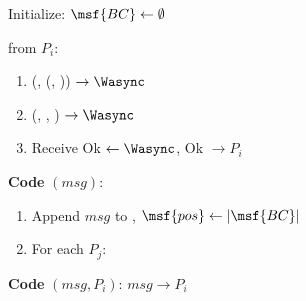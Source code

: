 \begin{bbox}[title={$\mathcal{F}_\msf{Atomic-Final}$}]

Initialize: $\msf{BC} \leftarrow \emptyset$

\OnInput {} from $P_i$:
	\begin{enumerate}
		\item \Send (\Leak, (, \Partyi)) $\rightarrow \Wasync$

		\item \Send (\Schedule, , ) $\rightarrow \Wasync$

		\item Receive Ok $\leftarrow \Wasync$, \Send Ok $\rightarrow P_i$

	\end{enumerate}
   
{\color{Blue} {\bf Code}  $(msg)$:}

	\begin{enumerate}
		\item {\color{Blue} Append $msg$ to , $\msf{pos} \leftarrow |\msf{BC}|$}

		\item {\color{Blue} For each $P_j$:}


		
    \end{enumerate}

{\color{Red} {\bf Code}  $(msg, P_i)$: \Send $msg \rightarrow P_i$ }


\end{bbox}
